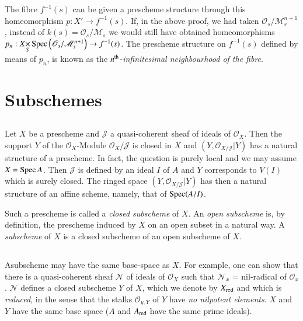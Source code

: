 \begin{note*}
The fibre $f^{-1}(s)$ can be given a prescheme structure through this
homeomorphism $p:X'\to f^{-1}(s)$. If, in the above proof, we had
taken $\mathscr{O}_{s}/\mathscr{M}_{s}^{n+1}$, instead of
$k(s)=\mathscr{O}_{s}/\mathscr{M}_{s}$ we would still have obtained
homeomorphisms
$p_{n}:\fprod{X}{\Spec}{S}\left(\mathscr{O}_{s}/\mathscr{M}_{s}^{n+1}\right)\to
f^{-1}(s)$. The prescheme structure on $f^{-1}(s)$ defined by means of
$p_{n}$, is known as the $n^{\rm th}$-{\em infinitesimal neighbourhood
  of the fibre}. 
\end{note*}

\section{Subschemes}\label{chap2-sec2.4}%

\setcounter{subsection}{-1}
\subsection{}\label{chap2-sec2.4.0}%

Let $X$ be a prescheme and $\mathscr{J}$ a quasi-coherent sheaf of
ideals of $\mathscr{O}_{X}$. Then the support $Y$ of the
$\mathscr{O}_{X}$-Module $\mathscr{O}_{X}/\mathscr{J}$ is closed in
$X$ and $(Y,\mathscr{O}_{X/\mathscr{J}}|Y)$ has a natural structure of
a prescheme. In fact, the question is purely local and we may assume
$X=\operatorname{Spec} A$. Then $\mathscr{J}$ is defined by an ideal $I$ of $A$ and
$Y$ corresponds to $V(I)$ which is surely closed. The ringed space
$(Y,\mathscr{O}_{X/\mathscr{J}}|Y)$ has then a natural structure of an
affine scheme, namely, that of $\operatorname{Spec}(A/I)$.

Such a prescheme is called a {\em closed subscheme} of $X$. An {\em
  open subscheme} is, by definition, the prescheme induced by $X$ on
an open subset in a natural way. A {\em subscheme} of $X$ is a closed
subscheme of an open subscheme of $X$.

\subsection{}\label{chap2-sec2.4.1}%

A\pageoriginale subscheme may have the same base-space as $X$. For
example, one can 
show that there is a quasi-coherent sheaf $\mathscr{N}$ of ideals of
$\mathscr{O}_{X}$ such that $\mathscr{N}_{x}$ = nil-radical of
$\mathscr{O}_{x}$. $\mathscr{N}$ defines a closed subscheme $Y$ of
$X$, which we denote by $X_{\operatorname{red}}$ and which is {\em reduced}, in the
sense that the stalks $\mathscr{O}_{y,Y}$ of $Y$ have {\em no
  nilpotent elements}. $X$ and $Y$ have the same base space ($A$ and
$A_{\operatorname{red}}$ have the same prime ideals).

